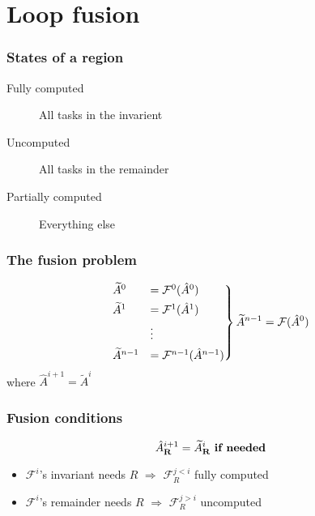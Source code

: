 \documentclass{beamer}
\newcommand*{\opF}{\mathcal{F}}
\begin{document}
\section{Loop fusion}

\frame{\sectionpage}

\begin{frame}
  \frametitle{States of a region}
  \begin{description}
  \item[Fully computed] All tasks in the invarient
  \item[Uncomputed] All tasks in the remainder
  \item[Partially computed] Everything else
  \end{description}
\end{frame}

\begin{frame}
  \frametitle{The fusion problem}
  \begin{equation*}
    \begin{rcases}
      \widetilde{A}^0 &= \opF^0(\hat{A}^0)\\
      \widetilde{A}^1 &= \opF^1(\hat{A}^1)\\
      &\vdots\\
      \widetilde{A}^{n - 1} &= \opF^{n - 1}(\hat{A}^{n - 1})
    \end{rcases} \widetilde{A}^{n - 1} = \opF(\hat{A}^0)
  \end{equation*}
  where $\hat{A}^{i + 1} = \widetilde{A}^i$
\end{frame}

\begin{frame}
  \frametitle{Fusion conditions}
  \begin{equation*}
    \hat{A}^{i + 1}_{\mathbf{R}} = \widetilde{A}_{\mathbf{R}}^i \text{ \textbf{if needed}}
  \end{equation*}

  \begin{itemize}
  \item $\opF^i$'s invariant needs $R$ $\Rightarrow$ $\opF^{j < i}_R$ fully computed
  \item $\opF^i$'s remainder needs $R$ $\Rightarrow$ $\opF^{j > i}_R$ uncomputed
  \end{itemize}
\end{frame}
\end{document}
